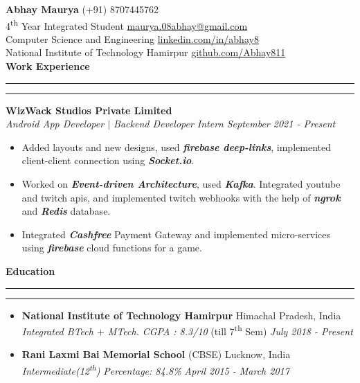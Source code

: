 \documentclass[11pt]{article}
\author{Abhay Maurya}
\begin{document}
	\LARGE{\textbf{Abhay Maurya}}
	\small
	\hfill
        (+91) 8707445762 \\
    4\textsuperscript{th} Year Integrated Student
    \hfill
        \href{mailto:maurya.08abhay@gmail.com}{\color{blue}maurya.08abhay@gmail.com}\\
    \hfill
        Computer Science and Engineering
    \hfill
        \href{https://www.linkedin.com/in/abhay8/}{\color{blue}linkedin.com/in/abhay8}\\
    \hfill
    National Institute of Technology Hamirpur
    \hfill
     	\href{https://github.com/Abhay811}{\color{blue}github.com/Abhay811}\\
    
    \vspace{4pt}
    \textbf{\large{Work Experience}}
    	\vspace{5pt}
    	\hrule \hrule
    	\vspace{4pt}
    	\textbf{WizWack Studios Private Limited}
    	\href{https://drive.google.com/file/d/1GKUMLnI26wRim3qdr-GsE-1DidYjr17D/view?usp=sharing}{\color{blue}}
    	\hfill
    	\\
    	\textit{Android App Developer $|$ Backend Developer Intern}
    	\hfill
    	\textit{September 2021 - Present}
    	\vspace{-2pt}
    	\begin{itemize}
    		\setlength{\itemsep}{0pt}
        	\setlength{\parskip}{0pt}
        	\setlength{\parsep}{0pt}
    		\item Added layouts and new designs, used \textit{\textbf{firebase deep-links}}, implemented client-client connection using \textit{\textbf{Socket.io}}.
    		\item Worked on \textit{\textbf{Event-driven Architecture}}, used \textit{\textbf{Kafka}}. Integrated youtube and twitch apis, and implemented twitch webhooks with the help of \textit{\textbf{ngrok}} and \textit{\textbf{Redis}} database. 
    		\item Integrated \textit{\textbf{Cashfree}} Payment Gateway and implemented micro-services using \textit{\textbf{firebase}} cloud functions for a game.
    		
    	\end{itemize}
    \textbf{\large{Education}}
    	\vspace{5pt}
    	\hrule \hrule
    	\vspace{-4pt}
    	\begin{itemize}
    		\setlength{\itemsep}{4pt}
        	\setlength{\parskip}{0pt}
        	\setlength{\parsep}{4pt}
        	\item \textbf{National Institute of Technology Hamirpur} \hfill Himachal Pradesh, India\\
        	\textsl{Integrated BTech $+$ MTech.} \textit{CGPA : 8.3/10}  (till 7\textsuperscript{th} Sem)
        	\hfill 
        	\textit{July 2018 - Present}
        	\item \textbf{Rani Laxmi Bai Memorial School} (CBSE) \hfill Lucknow, India\\
        	\textsl{Intermediate(12\textsuperscript{th}) } \textit{Percentage: 84.8\%}  \hfill 
        	\textit{April 2015 - March 2017}
    	\end{itemize}
\end{document}
